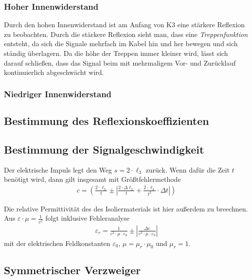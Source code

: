 \documentclass{article}
\begin{document}
\subsubsection{Hoher Innenwiderstand}

Durch den hohen Innenwiderstand ist am Anfang von K3 eine stärkere Reflexion zu beobachten. Durch die stärkere Reflexion sieht man, dass eine \textit{Treppenfunktion} entsteht, da sich die Signale mehrfach im Kabel hin und her bewegen und sich ständig überlagern. Da die höhe der Treppen immer kleiner wird, lässt sich darauf schließen, dass das Signal beim mit mehrmaligem Vor- und Zurücklauf kontinuierlich abgeschwächt wird.

\subsubsection{Niedriger Innenwiderstand}



\subsection{Bestimmung des Reflexionskoeffizienten}

\subsection{Bestimmung der Signalgeschwindigkeit}

Der elektrische Impuls legt den Weg $s = 2\cdot \ell_3$ zurück. Wenn dafür die Zeit $t$ benötigt wird, dann gilt insgesamt mit Größtfehlermethode
\begin{align*}
c = \left(\frac{2\cdot \ell_3}{t} \pm \left|\frac{2\cdot \Delta \ell_3}{t} + \frac{2\cdot \ell_3}{t^2}\cdot \Delta t\right|\right)
\end{align*}

Die relative Permittivität des des Isoliermaterials ist hier außerdem zu breechnen. Aus $\varepsilon \cdot \mu = \frac{1}{c^2}$ folgt inklusive Fehleranalyse
\begin{align*}
\varepsilon_r = \frac{1}{c^2\cdot \mu\cdot \varepsilon_0} \pm \left| \frac{\Delta c}{c^3\cdot \mu\cdot \varepsilon_0} \right|
\end{align*}
mit der elektrischen Feldkonstanten $\varepsilon_0$, $\mu = \mu_r\cdot\mu_0$ und $\mu_r=1$.

\subsection{Symmetrischer Verzweiger}
\end{document}
